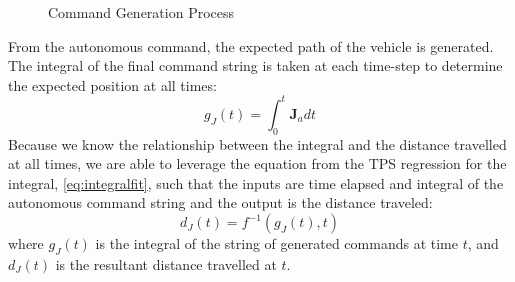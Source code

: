 \documentclass[letterpaper, 10 pt, conference]{ieeeconf}  %
\newcommand\NB[1]{$\spadesuit$\footnote{NB: #1}}
\begin{document}
\begin{figure}[h]
	\centering
	\caption{Command Generation Process}
	\label{fig:gensample}
\end{figure}

From the autonomous command, the expected path of the vehicle is generated. The integral of the final command string is taken at each time-step to determine the expected position at all times:
\begin{equation}
    g_J(t) = \int_0^t\bm{J}_a dt
\end{equation}
Because we know the relationship between the integral and the distance travelled at all times, we are able to leverage the equation from the TPS regression for the integral, \eqref{eq:integralfit}, such that the inputs are time elapsed and integral of the autonomous command string and the output is the distance traveled: %
\begin{equation} \label{eq:distresult}
d_J(t) = f^{-1}(g_J(t),t)
\end{equation}
where $g_J(t)$ is the integral of the string of generated commands at time $t$, and $d_J(t)$ is the resultant distance travelled at $t$.

\end{document}
